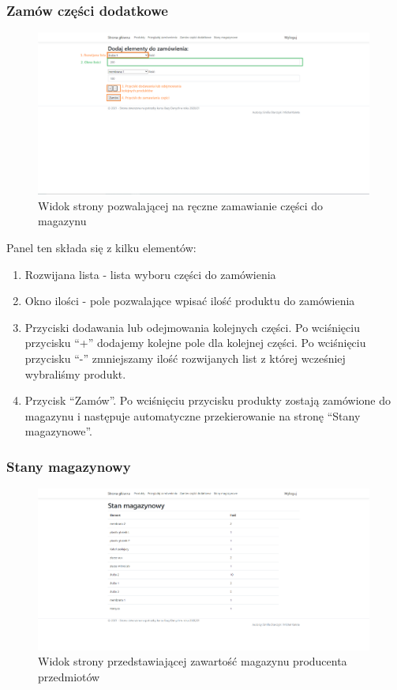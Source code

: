 \documentclass{article}
\begin{document}
\subsubsection{Zamów części dodatkowe}
\begin{figure}[H]
   \centering
   \includegraphics[width=0.99\textwidth,frame]{Wyglad/czesci_dodatkowe_admin.png}
   \caption{Widok strony pozwalającej na ręczne zamawianie części do magazynu}
\end{figure}
Panel ten składa się z kilku elementów:
\begin{enumerate}
   \item Rozwijana lista - lista wyboru części do zamówienia
   \item Okno ilości - pole pozwalające wpisać ilość produktu do zamówienia
   \item Przyciski dodawania lub odejmowania kolejnych części. Po wciśnięciu przycisku ``+''
         dodajemy kolejne pole dla kolejnej części. Po wciśnięciu przycisku ``-'' zmniejszamy ilość
         rozwijanych list z której wcześniej wybraliśmy produkt.
   \item Przycisk ``Zamów''. Po wciśnięciu przycisku produkty zostają zamówione do magazynu i
         następuje automatyczne przekierowanie na stronę ``Stany magazynowe''.
\end{enumerate}

\subsubsection{Stany magazynowy}
\begin{figure}[H]
   \centering
   \includegraphics[width=0.99\textwidth,frame]{Wyglad/magazyn_admin.png}
   \caption{Widok strony przedstawiającej zawartość magazynu producenta przedmiotów}
\end{figure}
\end{document}
